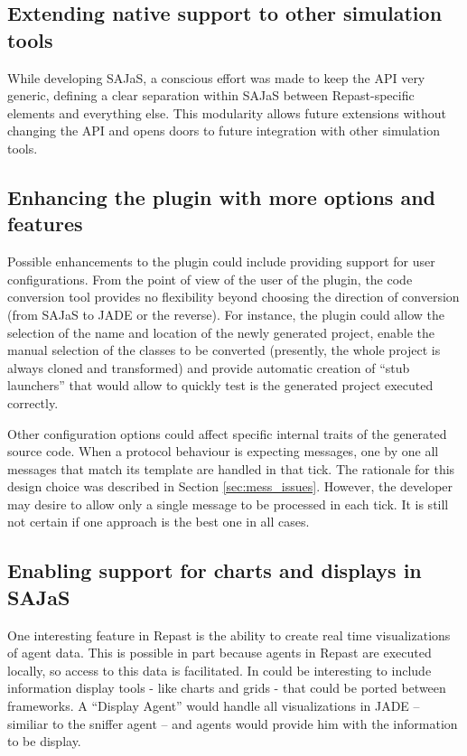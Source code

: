 \documentclass[a4paper,twoside]{article}
\begin{document}
\subsection{Extending native support to other simulation tools}
While developing SAJaS, a conscious effort was made to keep the API very generic, defining a clear separation within SAJaS between Repast-specific elements and everything else. This modularity allows future extensions without changing the API and opens doors to future integration with other simulation tools.

\subsection{Enhancing the plugin with more options and features}
Possible enhancements to the plugin could include providing support for user configurations. From the point of view of the user of the plugin, the code conversion tool provides no flexibility beyond choosing the direction of conversion (from SAJaS to JADE or the reverse). For instance, the plugin could allow the selection of the name and location of the newly generated project, enable the manual selection of the classes to be converted (presently, the whole project is always cloned and transformed) and provide automatic creation of ``stub launchers'' that would allow to quickly test is the generated project executed correctly.

Other configuration options could affect specific internal traits of the generated source code. When a protocol behaviour is expecting messages, one by one all messages that match its template are handled in that tick. The rationale for this design choice was described in Section \ref{sec:mess_issues}. However, the developer may desire to allow only a single message to be processed in each tick. It is still not certain if one approach is the best one in all cases.

\subsection{Enabling support for charts and displays in SAJaS}
One interesting feature in Repast is the ability to create real time visualizations of agent data. This is possible in part because agents in Repast are executed locally, so access to this data is facilitated. In could be interesting to include information display tools - like charts and grids - that could be ported between frameworks. A ``Display Agent'' would handle all visualizations in JADE -- similiar to the sniffer agent -- and agents would provide him with the information to be display.


\vfill

{\small
}

\vfill
\end{document}
